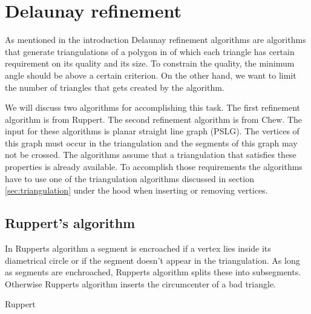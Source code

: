 \section{Delaunay refinement}
\label{sec:refinement}

As mentioned in the introduction Delaunay refinement algorithms are algorithms that generate triangulations of a polygon in of which each triangle has certain requirement on its quality and its size.
To constrain the quality, the minimum angle should be above a certain criterion.
On the other hand, we want to limit the number of triangles that gets created by the algorithm.

We will discuss two algorithms for accomplishing this task.
The first refinement algorithm is from Ruppert.
The second refinement algorithm is from Chew.
The input for these algorithms is planar straight line graph (PSLG). 
The vertices of this graph must occur in the triangulation and the segments of this graph may not be crossed.
The algorithms assume that a triangulation that satisfies these properties is already available.
To accomplish those requirements the algorithms have to use one of the triangulation algorithms discussed in section \ref{sec:triangulation} under the hood when inserting or removing vertices.
\cite{shewchuk}

\subsection{Ruppert's algorithm}
\label{sub:ruppert}

In Rupperts algorithm a segment is encroached if a vertex lies inside its diametrical circle or if the segment doesn't appear in the triangulation.
As long as segments are enchroached, Rupperts algorithm splits these into subsegments.
Otherwise Rupperts algorithm inserts the circumcenter of a bad triangle.
\cite{shewchuk}

\begin{algorithm}
    \caption{Ruppert}
    \begin{algorithmic}
                \Else
                \EndIf
            \EndWhile
        \EndFunction
    \end{algorithmic}
\end{algorithm}

